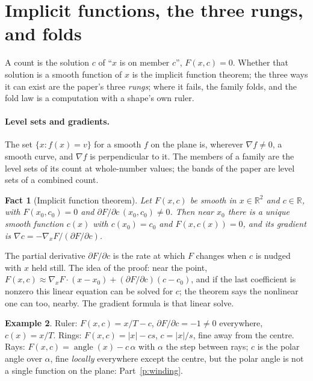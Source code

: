 \documentclass[10pt]{article}
\theoremstyle{plain}
\newtheorem{fact}{Fact}[section]
\theoremstyle{definition}
\newtheorem{example}[fact]{Example}
\newcommand{\R}{\mathbb{R}}
\begin{document}
\section{Implicit functions, the three rungs, and folds}
\label{p:implicit}

\begin{why}
A count is the solution $c$ of ``$x$ is on member $c$'', $F(x,c)=0$. Whether
that solution is a smooth function of $x$ is the implicit function theorem;
the three ways it can exist are the paper's three \emph{rungs}; where it
fails, the family folds, and the fold law is a computation with a shape's
own ruler.
\end{why}

\paragraph{Level sets and gradients.}
The set $\{x:f(x)=v\}$ for a smooth $f$ on the plane is, wherever
$\nabla f\ne0$, a smooth curve, and $\nabla f$ is perpendicular to it. The
members of a family are the level sets of its count at whole-number
values; the bands of the paper are level sets of a combined count.

\begin{fact}[Implicit function theorem]
Let $F(x,c)$ be smooth in $x\in\R^2$ and $c\in\R$, with $F(x_0,c_0)=0$ and
$\partial F/\partial c\,(x_0,c_0)\ne0$. Then near $x_0$ there is a unique
smooth function $c(x)$ with $c(x_0)=c_0$ and $F(x,c(x))=0$, and its
gradient is $\nabla c=-\nabla_xF/(\partial F/\partial c)$.
\end{fact}

The partial derivative $\partial F/\partial c$ is the rate at which $F$
changes when $c$ is nudged with $x$ held still. The idea of the proof: near
the point, $F(x,c)\approx\nabla_xF\cdot(x-x_0)+(\partial F/\partial c)(c-c_0)$,
and if the last coefficient is nonzero this linear equation can be solved
for $c$; the theorem says the nonlinear one can too, nearby. The gradient
formula is that linear solve.

\begin{example}
Ruler: $F(x,c)=x/T-c$, $\partial F/\partial c=-1\ne0$ everywhere,
$c(x)=x/T$. Rings: $F(x,c)=|x|-cs$, $c=|x|/s$, fine away from the centre.
Rays: $F(x,c)=\operatorname{angle}(x)-c\,\alpha$ with $\alpha$ the step
between rays; $c$ is the polar angle over $\alpha$, fine \emph{locally}
everywhere except the centre, but the polar angle is not a single function
on the plane: Part~\ref{p:winding}.
\end{example}
\end{document}
